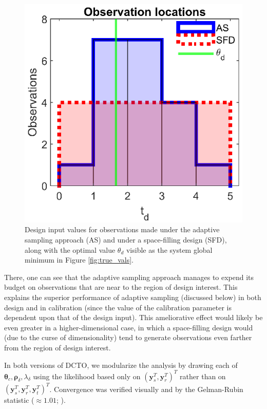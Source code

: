 \documentclass[10pt]{asme2ej}
\begin{document}
%
\begin{figure}
	\centering
	\includegraphics[scale=0.85]{figures/figure_6.eps}
	\captionsetup{width=.85\linewidth}
	\caption{Design input values for observations made under the adaptive sampling approach (AS) and under a space-filling design (SFD), along with the optimal value $\theta_d$ visible as the system global minimum in Figure \ref{fig:true_vals}.}
	\label{fig:AS_distribution}
\end{figure}
%
There, one can see that the adaptive sampling approach manages to expend its budget on observations that are near to the region of design interest.
%
This explains the superior performance of adaptive sampling (discussed below) in both design and in calibration (since the value of the calibration parameter is dependent upon that of the design input).
%
This ameliorative effect would likely be even greater in a higher-dimensional case, in which a space-filling design would (due to the curse of dimensionality) tend to generate observations even farther from the region of design interest.
%

%
In both versions of DCTO, we modularize the analysis by drawing each of $\boldsymbol\theta_c,\boldsymbol\rho_\delta,\lambda_\delta$ using the likelihood based only on $(\mathbf y_s^T,\mathbf y_r^T)^T$ rather than on $(\mathbf y_s^T,\mathbf y_r^T,\mathbf y_t^T)^T$.
%
Convergence was verified visually and by the Gelman-Rubin statistic ($\approx 1.01$; \cite{Gelman1992a}).
%
\end{document}
